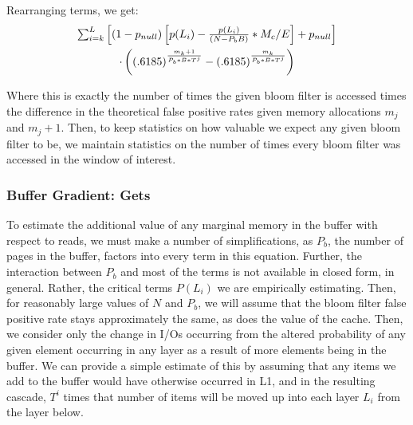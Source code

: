 \documentclass{cidr-2019}
\begin{document}
Rearranging terms, we get:
\begin{multline}
$$\sum_{i=k}^{L} \left[(1-p_{null})\left[p(L_i) - \frac{p(L_i)}{(N - P_bB)} * M_c/E \right] +  p_{null} \right] \\ \cdot \left( (.6185) ^  {\frac{m_k+1}{P_b*B*T^j}} - (.6185) ^  {\frac{m_k}{P_b*B*T^j}}\right)$$
\end{multline}

Where this is exactly the number of times the given bloom filter is accessed
times the difference in the theoretical false positive rates given memory
allocations $m_j$ and $m_j+1$. Then, to keep statistics on how valuable we
expect any given bloom filter to be, we maintain statistics on the number of
times every bloom filter was accessed in the window of interest.

\subsubsection{Buffer Gradient: Gets}

To estimate the additional value of any marginal memory in the buffer with
respect to reads, we must make a number of simplifications, as $P_b$, the number
of pages in the buffer, factors into every term in this equation. Further, the
interaction between $P_b$ and most of the terms is not available in closed form,
in general. Rather, the critical terms $P(L_i)$ we are empirically estimating.
Then, for reasonably large values of $N$ and $P_b$, we will assume that the bloom
filter false positive rate stays approximately the same, as does the value of
the cache. Then, we consider only the change in I/Os occurring from the altered
probability of any given element occurring in any layer as a result of more
elements being in the buffer. We can provide a simple estimate
of this by assuming that any items we add to the buffer would have
otherwise occurred in L1, and in the resulting cascade, $T^{i}$ times that number of items will be moved up into 
each layer $L_{i}$ from the layer below.
\end{document}
